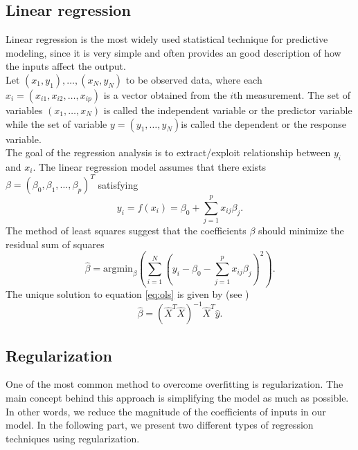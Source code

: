 \documentclass [11pt]{article}
\begin{document}
\subsection{Linear regression}
Linear regression is the most widely used statistical technique for predictive modeling, since it is very simple and often provides an good description of how the inputs affect the output.\\
Let $(x_{1},y_{1}),\ldots,(x_{N},y_{N})$ to be observed data, where each $x_{i} = (x_{i1},x_{i2},\ldots,x_{i p})$ is a vector obtained from the $i\text{th}$ measurement. The set of variables $(x_{1},\ldots,x_{N})$ is called the independent variable or the predictor variable while the set of variable $y=(y_{1},\ldots,y_{N})$is called the dependent or the response variable. \\
The goal of the regression analysis is to extract/exploit relationship between $y_i$ and $x_i$. The linear regression model assumes that there exists $\beta=(\beta_{0},\beta_{1},\ldots,\beta_{p})^{T}$ satisfying 
\begin{equation}
y_{i}=f(x_{i})=\beta_{0} + \sum_{j=1}^{p}x_{ij}\beta_{j}.
\end{equation}
The method of least squares suggest that the coefficients $\beta$ should minimize the residual sum of squares
\begin{equation}
\hat{\beta}=\text{argmin}_{\beta} ( \sum_{i=1}^{N}(y_{i}- \beta_{0}- \sum_{j=1}^{p}x_{ij}\beta_{j})^{2}).
\label{eq:ols}
\end{equation}
The unique solution to equation \eqref{eq:ols} is given by (see \cite{def})
\begin{equation}
\hat{\beta} =\left(\hat{X}^T\hat{X}\right)^{-1}\hat{X}^T\hat{y}.
\end{equation}

\subsection{Regularization}
One of the most common method to overcome overfitting is regularization. The main concept behind this approach is simplifying the model as much as possible. In other words, we reduce the magnitude of the coefficients of inputs in our model. In the following part, we present two different types of regression techniques using regularization.
\end{document}
